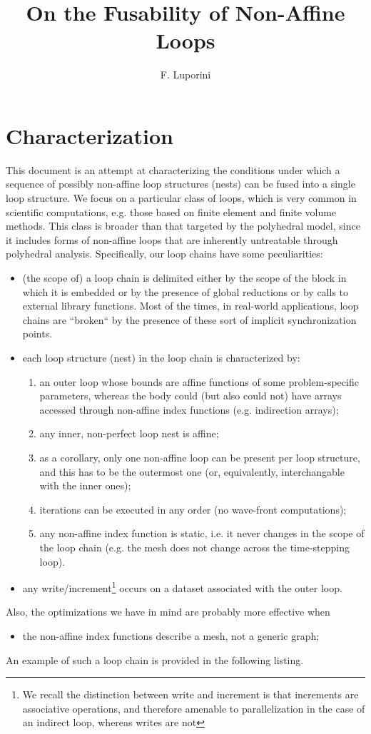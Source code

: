 \documentclass[a4paper]{article}
\title{On the Fusability of Non-Affine Loops}
\author{F. Luporini}
\date{}
\begin{document}
\lstset{language=C, breaklines=true}
 
\maketitle

\section{Characterization}
This document is an attempt at characterizing the conditions under which a sequence of possibly non-affine loop structures (nests) can be fused into a single loop structure. We focus on a particular class of loops, which is very common in scientific computations, e.g. those based on finite element and finite volume methods. This class is broader than that targeted by the polyhedral model, since it includes forms of non-affine loops that are inherently untreatable through polyhedral analysis. Specifically, our loop chains have some peculiarities:
\begin{itemize}
\item (the scope of) a loop chain is delimited either by the scope of the block in which it is embedded or by the presence of global reductions or by calls to external library functions. Most of the times, in real-world applications, loop chains are ``broken`` by the presence of these sort of implicit synchronization points.
\item each loop structure (nest) in the loop chain is characterized by:
  \begin{enumerate}
  \item an outer loop whose bounds are affine functions of some problem-specific parameters, whereas the body could (but also could not) have arrays accessed through non-affine index functions (e.g. indirection arrays);
  \item any inner, non-perfect loop nest is affine;
  \item as a corollary, only one non-affine loop can be present per loop structure, and this has to be the outermost one (or, equivalently, interchangable with the inner ones);
  \item iterations can be executed in any order (no wave-front computations);
  \item any non-affine index function is static, i.e. it never changes in the scope of the loop chain (e.g. the mesh does not change across the time-stepping loop).
  \end{enumerate}
\item any write/increment\footnote{We recall the distinction between write and increment is that increments are associative operations, and therefore amenable to parallelization in the case of an indirect loop, whereas writes are not} occurs on a dataset associated with the outer loop.
\end{itemize}
Also, the optimizations we have in mind are probably more effective when
\begin{itemize}
\item the non-affine index functions describe a mesh, not a generic graph;
\end{itemize}
An example of such a loop chain is provided in the following listing.
\end{document}
